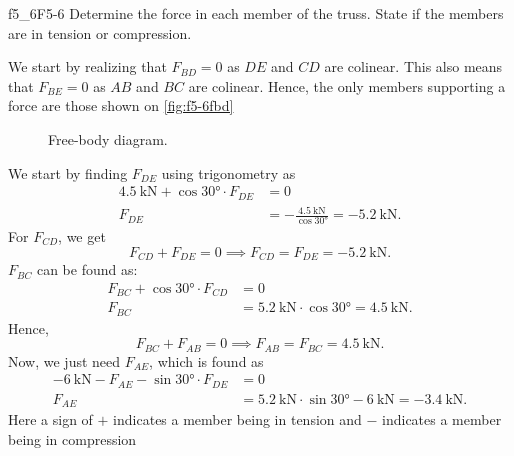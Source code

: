 
\begin{problemwithimage}{f5_6}{F5-6}
  Determine the force in each member of the truss.
  State if the members are in tension or compression.
\end{problemwithimage}

\begin{derivation}
  We start by realizing that $F_{BD} = 0$ as $DE$ and $CD$ are colinear.
  This also means that $F_{BE} = 0$ as $AB$ and $BC$ are colinear.
  Hence, the only members supporting a force are those shown on \autoref{fig:f5-6fbd}
  \begin{figure}[ht]
    \centering
    \caption{Free-body diagram.}
    \label{fig:f5-6fbd}
  \end{figure}
  We start by finding $F_{DE}$ using trigonometry as
  \begin{align*}
    \qty{4,5}{\kN} + \cos \ang{30} \cdot F_{DE} &= 0 \\
    F_{DE} &= - \frac{\qty{4.5}{\kN} }{\cos \ang{30} } = \qty{-5.2}{\kN}
  .\end{align*}
  For $F_{CD}$, we get
  \begin{equation*}
    F_{CD} + F_{DE} = 0 \implies F_{CD} = F_{DE} = \qty{-5,2}{\kN}
  .\end{equation*}
  $F_{BC}$ can be found as:
  \begin{align*}
    F_{BC} + \cos \ang{30} \cdot F_{CD} &= 0 \\
    F_{BC} &= \qty{5.2}{\kN} \cdot \cos \ang{30}  = \qty{4.5}{\kN}
  .\end{align*}
  Hence,
  \begin{equation*}
    F_{BC} + F_{AB} = 0 \implies F_{AB} = F_{BC} = \qty{4,5}{\kN} 
  .\end{equation*}
  Now, we just need $F_{AE}$, which is found as
  \begin{align*}
    - \qty{6}{\kN} - F_{AE} - \sin \ang{30} \cdot F_{DE} &= 0 \\
    F_{AE} &= \qty{5.2}{\kN} \cdot \sin \ang{30} - \qty{6}{\kN} = -\qty{3,4}{\kN}
  .\end{align*}
  Here a sign of $+$ indicates a member being in tension and $-$ indicates a member being in compression
\end{derivation}



